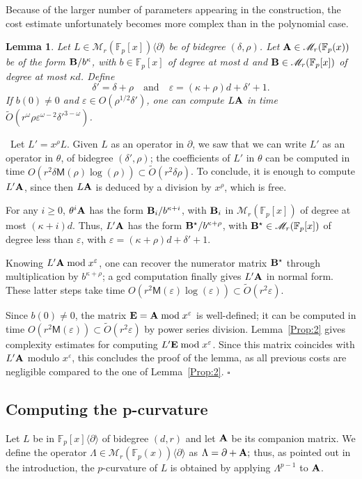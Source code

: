 \documentclass{sig-alternate}
\newcommand{\bigOsoft}{\tilde{O}}
\def\F {\mathbb{F}}
\def\M{\ensuremath{\mathsf{M}}}
\def\mA {\ensuremath{{\bf A}}}
\def\mB {\ensuremath{{\bf B}}}
\def\mE {\ensuremath{{\bf E}}}
\def\myproof{\noindent{\sc Proof.}~}
\def\foorp{\hfill$\square$}
\newtheorem{Lemma}{Lemma}
\begin{document}
Because of the larger number of parameters appearing in the
construction, the cost estimate unfortunately becomes more complex than
in the polynomial case.
\begin{Lemma}\label{prop:eval}
  Let $L \in \mathscr{M}_r(\F_p[x])\langle \partial \rangle$ be of
  bidegree $(\delta,\rho)$. Let $\mA \in \mathscr{M}_r(\F_p(x))$ be of
  the form $\mB/b^\kappa$, with $b \in \F_p[x]$ of degree at most $d$
  and $\mB \in \mathscr{M}_r(\F_p[x])$ of degree at most $\kappa
  d$. Define
  $$\delta'=\delta+\rho\quad\text{and}\quad\varepsilon =
  (\kappa+\rho)d+\delta'+1.$$ If $b(0)\ne 0$ and $\varepsilon \in
  O(\rho^{1/2} \delta')$, one can compute $L \mA$ in time 
  $\bigOsoft(r^\omega \rho \varepsilon^{\omega-2} {\delta'}^{3-\omega})$.
\end{Lemma}
\myproof Let $L'=x^\rho L$. Given $L$ as an operator in $\partial$, we
saw that we can write $L'$ as an operator in $\theta$, of bidegree
$(\delta',\rho)$; the coefficients of $L'$ in $\theta$ can be computed
in time $O(r^2 \delta \M(\rho)\log(\rho)) \subset \bigOsoft(r^2 \delta
\rho)$. To conclude, it is enough to compute $L' \mA$, since then $L
\mA$ is deduced by a division by $x^\rho$, which is free.

For any $i\ge 0$, $\theta^i \mA$ has the form $\mB_i/b^{\kappa+i}$,
with $\mB_i$ in $\mathscr{M}_r(\F_p[x])$ of degree at most
$(\kappa+i)d$. Thus, $L' \mA$ has the form
$\mB^\star/b^{\kappa+\rho}$, with $\mB^\star \in
\mathscr{M}_r(\F_p[x])$ of degree less than $\varepsilon$, with
$\varepsilon=(\kappa+\rho)d+\delta'+1$.

Knowing $L' \mA \bmod x^\varepsilon$, one can recover the numerator
matrix $\mB^\star$ through multiplication by $b^{\kappa+\rho}$; a gcd
computation finally gives $L'\mA$ in normal form. These latter steps
take time $O(r^2 \M(\varepsilon)\log(\varepsilon))\subset
\bigOsoft(r^2 \varepsilon)$.

Since $b(0)\ne 0$, the matrix $\mE=\mA \bmod x^\varepsilon$ is
well-defined; it can be computed in time $O(r^2
\M(\varepsilon))\subset \bigOsoft(r^2 \varepsilon)$ by power series
division. Lemma~\ref{Prop:2} gives complexity estimates for computing
$L'\mE \bmod x^\varepsilon$. Since this matrix coincides with $L'\mA$
modulo $x^\varepsilon$, this concludes the proof of the lemma, as all
previous costs are negligible compared to the one of
Lemma~\ref{Prop:2}. \foorp



\subsection{Computing the p-curvature}
\noindent Let $L$ be in $\F_p[x]\langle \partial \rangle$ of bidegree
$(d,r)$ and let $\mA$ be its companion matrix. We define the operator
$\Lambda \in \mathscr{M}_r(\F_p(x))\langle \partial \rangle$ as
$\Lambda = \partial + \mA;$ thus, as pointed out in the introduction,
the $p$-curvature of $L$ is obtained by applying $\Lambda^{p-1}$ to
$\mA$.
\end{document}
